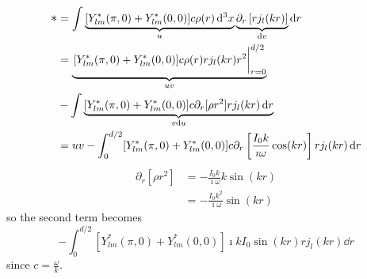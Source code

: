 \documentclass[a4paper,twoside]{article}
\begin{document}
\begin{itemize}
\begin{problem}
            \begin{align}
                \mathlarger{\ast} &= \int \underbrace{[Y_{lm}^*(\pi,0) + Y_{lm}^*(0,0)]  c \rho(r) \dd[3]{x}}_{u} \underbrace{\partial_r \left[ r j_l(kr) \right]}_{\dd{v}} \dd{r} \\
                &= \underbrace{\eval{[Y_{lm}^*(\pi,0) + Y_{lm}^*(0,0)] c \rho(r) r j_l(kr) r^2}_{r = 0}^{d/2}}_{uv} \\ 
                &- \int \underbrace{ [Y^*_{lm}(\pi,0) + Y^*_{lm}(0,0)] c \partial_r[\rho r^2] r j_l(kr) \dd{r}}_{v \dd{u}} \\
                &= uv - \int_{0}^{d/2} [Y_{lm}^*(\pi,0) + Y_{lm}^*(0,0)] c \partial_r \left[ \frac{I_0 k}{\imath \omega} \cos(kr)  \right] r j_l(kr) \dd{r}
            \end{align}
            \begin{align}
                \partial_r \left[ \rho r^2 \right] &= -\frac{I_0k}{\imath \omega} k\sin(kr)  \\
                &= -\frac{I_0k^2}{\imath \omega} \sin(kr)
            \end{align}
            so the second term becomes
            \begin{equation}
                -\int_{0}^{d/2} [Y_{lm}^*(\pi,0) + Y_{lm}^*(0,0)] \imath k I_0 \sin(kr) r j_l(kr) \dd{r}
            \end{equation}
            since $ c = \frac{\omega}{k} $.


\end{problem}
\end{itemize}
\end{document}
